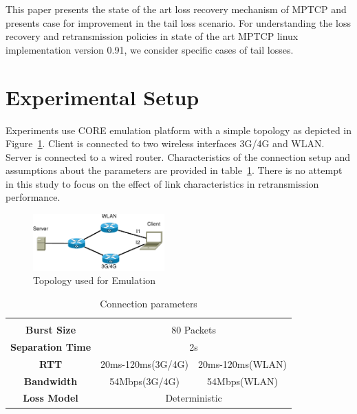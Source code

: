 \documentclass[10pt,draftcls,twocolumn]{IEEEconf}
\begin{document}
This paper presents the state of the art loss recovery mechanism of MPTCP and presents case for improvement in the tail loss scenario. For understanding the loss recovery and retransmission policies 
in state of the art MPTCP linux implementation version 0.91, we consider specific cases of tail losses.  


\section{Experimental Setup}\label{exsetup}

Experiments use CORE emulation platform with a simple topology as depicted in Figure~\ref{fig1}.
Client is connected to two wireless interfaces 3G/4G and WLAN. Server is connected to a wired router.
Characteristics of the connection setup and assumptions about the parameters are provided in table~\ref{tab1}.
There is no attempt in this study to focus on the effect of link characteristics in retransmission performance.
 
\begin{figure}[!ht]
\begin{center}
\includegraphics[angle=0, width=0.45\textwidth]{images/fortest.pdf}
\caption{Topology used for Emulation}\label{fig1}
\end{center}
\end{figure}
\begin{center}

\begin{table}
\begin{center}
\begin{tabular}{|c|cccccccccc|}
      \hline
      \multicolumn{1}{c}{} & & \\[\dimexpr-\normalbaselineskip-\arrayrulewidth]
      \textbf{Burst Size} & \multicolumn{10}{c|}{80 Packets} \\
      \hline
      \textbf{Separation Time} & \multicolumn{10}{c|}{2s} \\
      \hline

      \textbf{RTT} & \multicolumn{5}{c|}{20ms-120ms(3G/4G)} & \multicolumn{5}{c|}{20ms-120ms(WLAN)} \\
      \hline 	
      \textbf{Bandwidth} & \multicolumn{5}{c|}{54Mbps(3G/4G)} & \multicolumn{5}{c|}{54Mbps(WLAN)} \\
      \hline
      \textbf{Loss Model} & \multicolumn{10}{c|}{Deterministic}\\
      \hline
\end{tabular}
\caption{Connection parameters}\label{tab1}
\end{center}
\end{table}
\end{center}
\end{document}
